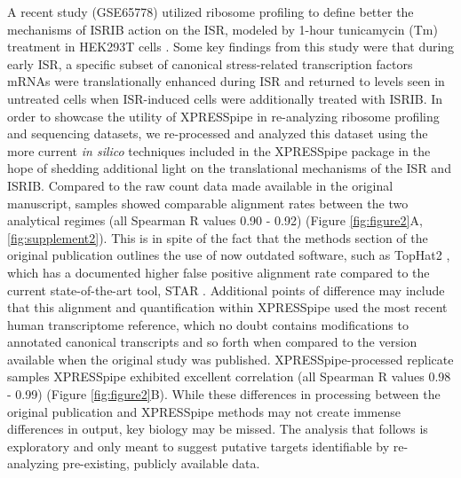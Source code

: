 \documentclass[11pt, a4paper, oneside]{article}
\begin{document}
A recent study (GSE65778) utilized ribosome profiling to define better the mechanisms of ISRIB action on the ISR, modeled by 1-hour tunicamycin (Tm) treatment in HEK293T cells \cite{isrib_riboseq}. Some key findings from this study were that during early ISR, a specific subset of canonical stress-related transcription factors mRNAs were translationally enhanced during ISR and returned to levels seen in untreated cells when ISR-induced cells were additionally treated with ISRIB. In order to showcase the utility of XPRESSpipe in re-analyzing ribosome profiling and sequencing datasets, we re-processed and analyzed this dataset using the more current \textit{in silico} techniques included in the XPRESSpipe package in the hope of shedding additional light on the translational mechanisms of the ISR and ISRIB. Compared to the raw count data made available in the original manuscript, samples showed comparable alignment rates between the two analytical regimes (all Spearman R values 0.90 - 0.92) (Figure \ref{fig:figure2}A, \ref{fig:supplement2}). This is in spite of the fact that the methods section of the original publication outlines the use of now outdated software, such as TopHat2 \cite{tophat2}, which has a documented higher false positive alignment rate compared to the current state-of-the-art tool, STAR \cite{alignment_benchmark, star}. Additional points of difference may include that this alignment and quantification within XPRESSpipe used the most recent human transcriptome reference, which no doubt contains modifications to annotated canonical transcripts and so forth when compared to the version available when the original study was published. XPRESSpipe-processed replicate samples XPRESSpipe exhibited excellent correlation (all Spearman R values 0.98 - 0.99) (Figure \ref{fig:figure2}B). While these differences in processing between the original publication and XPRESSpipe methods may not create immense differences in output, key biology may be missed. The analysis that follows is exploratory and only meant to suggest putative targets identifiable by re-analyzing pre-existing, publicly available data. \par
\end{document}
